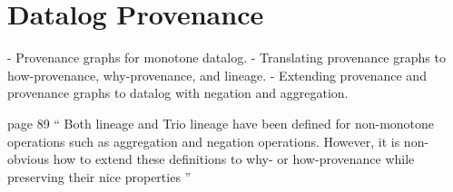 \section{Datalog Provenance}
- Provenance graphs for monotone datalog.
- Translating provenance graphs to how-provenance, why-provenance, and lineage.
- Extending provenance and provenance graphs to datalog with negation and
  aggregation.

page 89
``
Both lineage and Trio lineage have been defined for non-monotone operations
such as aggregation and negation operations. However, it is non-obvious how to
extend these definitions to why- or how-provenance while preserving their nice
properties
''

